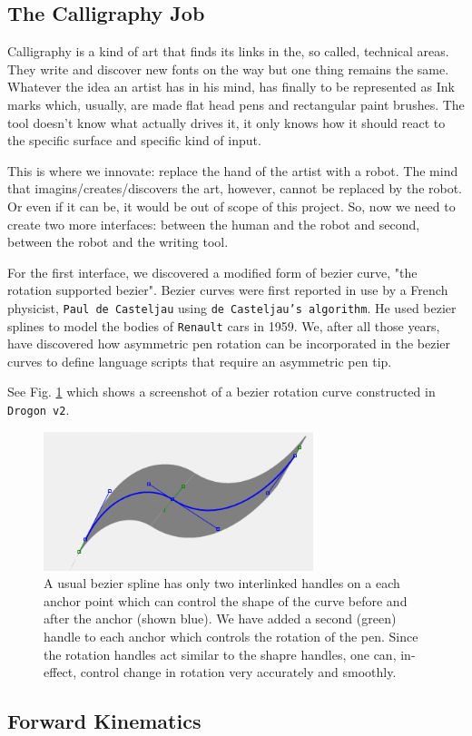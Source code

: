 \subsection{The Calligraphy Job}
{
        Calligraphy is a kind of art that finds its links in the, so called, technical areas. They write and discover new fonts on the way but one thing remains the same. Whatever the idea an artist has in his mind, has finally to be represented as Ink marks which, usually, are made flat head pens and rectangular paint brushes. The tool doesn't know what actually drives it, it only knows how it should react to the specific surface and specific kind of input.

        This is where we innovate: replace the hand of the artist with a robot. The mind that imagins/creates/discovers the art, however, cannot be replaced by the robot. Or even if it can be, it would be out of scope of this project. So, now we need to create two more interfaces: between the human and the robot and second, between the robot and the writing tool.

        For the first interface, we discovered a modified form of bezier curve, "the rotation supported bezier". Bezier curves were first reported in use by a French physicist, \texttt{Paul de Casteljau} using \texttt{de Casteljau's algorithm}. He used bezier splines to model the bodies of \texttt{Renault} cars in 1959. We, after all those years, have discovered how asymmetric pen rotation can be incorporated in the bezier curves to define language scripts that require an asymmetric pen tip.

        See Fig. \ref{FigBezier} which shows a screenshot of a bezier rotation curve constructed in \texttt{Drogon v2}.

        \begin{figure}
          \centering
          \includegraphics[width=0.7\textwidth]{bezier.png}
          \caption{A usual bezier spline has only two interlinked handles on a each anchor point which can control the shape of the curve before and after the anchor (shown blue). We have added a second (green) handle to each anchor which controls the rotation of the pen. Since the rotation handles act similar to the shapre handles, one can, in-effect, control change in rotation very accurately and smoothly.
          } \label{FigBezier}
        \end{figure}

    }
\subsection{Forward Kinematics} 